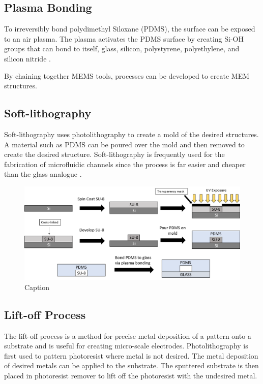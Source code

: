  \subsection*{Plasma Bonding}
 
 \par To irreversibly bond polydimethyl Siloxane (PDMS), the surface can be exposed to an air plasma. The plasma activates the PDMS surface by creating Si-OH groups that can bond to itself, glass, silicon, polystyrene, polyethylene, and silicon nitride \cite{mcdonald_polydimethylsiloxane_2002-1}.
 \par By chaining together MEMS tools, processes can be developed to create MEM structures. 
 
 \subsection*{Soft-lithography}
 
 \par Soft-lithography uses photolithography to create a mold of the desired structures. A material such as PDMS can be poured over the mold and then removed to create the desired structure. Soft-lithography is frequently used for the fabrication of microfluidic channels since the process is far easier and cheaper than the glass analogue \cite{whitesides_soft_2001}.
 
 \begin{figure}[h]
     \centering
     \includegraphics[width=\textwidth]{images/softLithography.png}
     \caption{Caption}
     \label{fig:my_label}
 \end{figure}
 
 
 \subsection*{Lift-off Process}
 
 \par The lift-off process is a method for precise metal deposition of a pattern onto a substrate and is useful for creating micro-scale electrodes. Photolithography is first used to pattern photoresist where metal is not desired. The metal deposition of desired metals can be applied to the substrate. The sputtered substrate is then placed in photoresist remover to lift off the photoresist with the undesired metal. 
 
